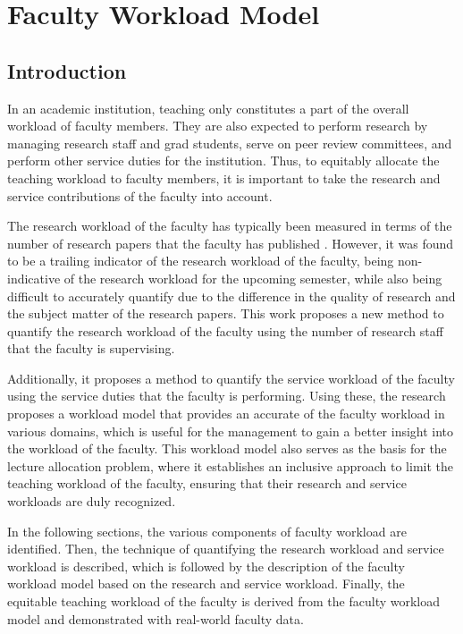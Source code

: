 \chapter{Faculty Workload Model}

\section{Introduction}

In an academic institution, teaching only constitutes a part of the overall workload of faculty members. They are also expected to perform research by managing research staff and grad students, serve on peer review committees, and perform other service duties for the institution. Thus, to equitably allocate the teaching workload to faculty members, it is important to take the research and service contributions of the faculty into account.

The research workload of the faculty has typically been measured in terms of the number of research papers that the faculty has published \cite{finlay1994management, narasimhan32trase}. However, it was found to be a trailing indicator of the research workload of the faculty, being non-indicative of the research workload for the upcoming semester, while also being difficult to accurately quantify due to the difference in the quality of research and the subject matter of the research papers. This work proposes a new method to quantify the research workload of the faculty using the number of research staff that the faculty is supervising.

Additionally, it proposes a method to quantify the service workload of the faculty using the service duties that the faculty is performing. Using these, the research proposes a workload model that provides an accurate of the faculty workload in various domains, which is useful for the management to gain a better insight into the workload of the faculty. This workload model also serves as the basis for the lecture allocation problem, where it establishes an inclusive approach to limit the teaching workload of the faculty, ensuring that their research and service workloads are duly recognized.

In the following sections, the various components of faculty workload are identified. Then, the technique of quantifying the research workload and service workload is described, which is followed by the description of the faculty workload model based on the research and service workload. Finally, the equitable teaching workload of the faculty is derived from the faculty workload model and demonstrated with real-world faculty data.

